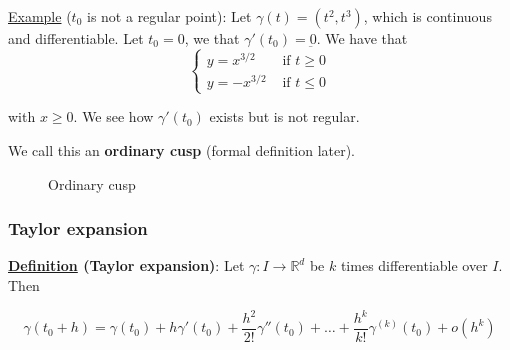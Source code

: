 \documentclass[10pt]{extarticle}
\newcommand{\R}{\mathbb{R}}
\newcommand{\munderbar}[1]{\underbar{\ensuremath{#1}}}
\begin{document}
\underline{Example} ($t_0$ is not a regular point):
Let $\gamma(t) = (t^2, t^3)$, which is continuous and differentiable.
Let $t_0 = 0$, we that $\gamma'(t_0) = \munderbar{0}$.
We have that
$$
    \begin{cases}
        y = x^{3/2}  & \text{ if } t \geq 0 \\
        y = -x^{3/2} & \text{ if } t \leq 0
    \end{cases}
$$

with $x \geq 0$. We see how $\gamma'(t_0)$ exists but is not regular.

We call this an \textbf{ordinary cusp} (formal definition later).

\begin{figure}[H]
    \centering
    \caption{Ordinary cusp}
    \label{fig:ordinary_cusp}
\end{figure}

\subsubsection{Taylor expansion}

\textbf{\underline{Definition} (Taylor expansion)}:
Let $\gamma: I \to \R^d$ be $k$ times differentiable over $I$.
Then

$$
    \gamma(t_0 + h) =
    \gamma(t_0) +
    h \gamma'(t_0) +
    \frac{h^2}{2!} \gamma''(t_0) +
    \ldots +
    \frac{h^k}{k!} \gamma^{(k)}(t_0) +
    o(h^k)
$$
\end{document}
